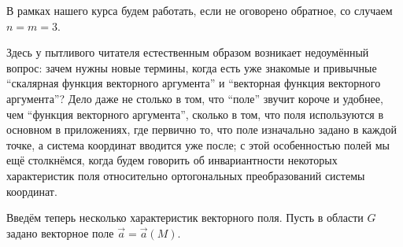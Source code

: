 

В рамках нашего курса будем работать, если не оговорено обратное, со случаем $n=m=3$.

Здесь у пытливого читателя естественным образом возникает недоумённый вопрос: зачем нужны новые термины, когда есть уже знакомые и привычные ``скалярная функция векторного аргумента'' и ``векторная функция векторного аргумента''? Дело даже не столько в том, что ``поле'' звучит короче и удобнее, чем ``функция векторного аргумента'', сколько в том, что поля используются в основном в приложениях, где первично то, что поле изначально задано в каждой точке, а система координат вводится уже после; с этой особенностью полей мы ещё столкнёмся, когда будем говорить об инвариантности некоторых характеристик поля относительно ортогональных преобразований системы координат.

Введём теперь несколько характеристик векторного поля. Пусть в области $G$ задано векторное поле $\vec{a}=\vec{a}(M)$.

